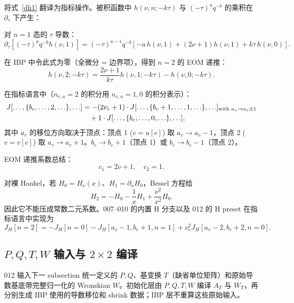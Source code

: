 ﻿\documentclass[a4paper,11pt]{article}
\begin{document}
将式~\eqref{dh1} 翻译为指标操作。被积函数中 $h(\nu, n; -k\tau)$ 与 $(-\tau)^a q^{-b}$ 的乘积在 $\partial_\tau$ 下产生：

对 $n=1$ 态的 $\tau$ 导数：
\begin{equation}
  \partial_\tau [(-\tau)^a q^{-b} h(\nu, 1)] = (-\tau)^{a-1} q^{-b} \left[ -a\, h(\nu,1) + (2\nu+1) h(\nu,1) + k\tau\, h(\nu,0) \right].
\end{equation}

在 IBP 中令此式为零（全微分 = 边界项），得到 $n=2$ 的 EOM 递推：
\begin{equation}
  \boxed{h(\nu, 2; -k\tau) = \frac{2\nu+1}{k\tau} h(\nu, 1; -k\tau) - h(\nu, 0; -k\tau).}
  \label{EOMrecurrence}
\end{equation}

在指标语言中（$n_{e,a} = 2$ 的积分用 $n_{e,a} = 1, 0$ 的积分表示）：
\begin{align}
  J[\ldots, \{b_e, \ldots, 2, \ldots\}, \ldots] &= -(2\nu_e + 1) \cdot J[\ldots, \{b_e + 1, \ldots, 1, \ldots\}, \ldots]_{\text{with } a_v \to a_v \pm 1} \notag \\
  &\quad + 1 \cdot J[\ldots, \{b_e, \ldots, 0, \ldots\}, \ldots],
  \label{EOMindex}
\end{align}
其中 $a_v$ 的移位方向取决于顶点：顶点 1 ($v = u[e]$) 取 $a_v \to a_v - 1$，顶点 2 ($v = v[e]$) 取 $a_v \to a_v + 1$。$b_e \to b_e + 1$（顶点 1）或 $b_e \to b_e - 1$（顶点 2）。

EOM 递推系数总结：
\begin{equation}
  c_1 = 2\nu + 1, \quad c_2 = 1.
  \label{EOMcoeffs}
\end{equation}

对裸 Hankel，若 $H_0=H_\nu(x)$、$H_1=\partial_xH_0$，Bessel 方程给
\begin{equation}
 H_2=-H_0-\frac{1}{x}H_1+\frac{\nu^2}{x^2}H_0.
 \label{bareHEOMrecurrence}
\end{equation}
因此它不能压成常数二元系数。007--010 的内置 H 分支以及 012 的 H preset 在指标语言中实现为
\begin{equation}
 J_H[n=2]=-J_H[n=0]-J_H[a_v-1,b_e+1,n=1]
 +\nu_e^2J_H[a_v-2,b_e+2,n=0].
 \label{bareHEOMindex}
\end{equation}

\subsection{$P,Q,T,W$ 输入与 $2\times2$ 编译}

012 输入下一 subsection 统一定义的 $P,Q$、基变换 $T$（缺省单位矩阵）和原始导数基底带完整归一化的 Wronskian $W$。初始化层由 $P,Q,T,W$ 编译 $A_T$ 与 $W_T$，再分别生成 IBP 使用的导数移位和 shrink 数据；IBP 层不重算这些原始输入。
\end{document}
